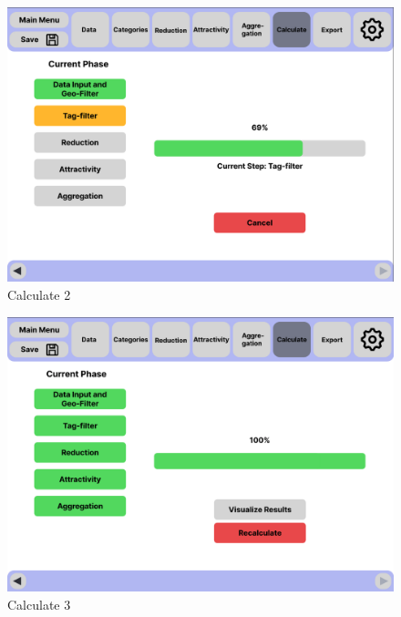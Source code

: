 \documentclass[parskip=full]{scrartcl} %
\begin{document}
\begin{figure}
    \centering
    \includegraphics[width=1\textwidth]{pictures/Calculate 2.png}
    \caption{Calculate 2}
\end{figure}

\begin{figure}
    \centering
    \includegraphics[width=1\textwidth]{pictures/Calculate 3.png}
    \caption{Calculate 3}
\end{figure}
\end{document}
